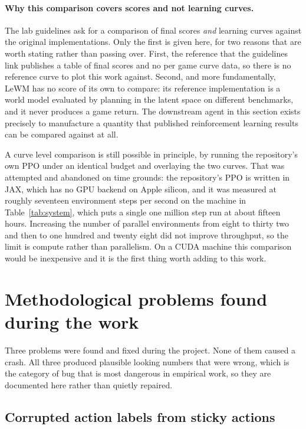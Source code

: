 \documentclass[11pt,a4paper]{article}
\begin{document}
\paragraph{Why this comparison covers scores and not learning curves.} The lab
guidelines ask for a comparison of final scores \emph{and} learning curves against
the original implementations. Only the first is given here, for two reasons that
are worth stating rather than passing over. First, the reference that the
guidelines link publishes a table of final scores and no per game curve data, so
there is no reference curve to plot this work against. Second, and more
fundamentally, LeWM has no score of its own to compare: its reference
implementation is a world model evaluated by planning in the latent space on
different benchmarks, and it never produces a game return. The downstream agent in
this section exists precisely to manufacture a quantity that published
reinforcement learning results can be compared against at all.

A curve level comparison is still possible in principle, by running the
repository's own PPO under an identical budget and overlaying the two curves. That
was attempted and abandoned on time grounds: the repository's PPO is written in
JAX, which has no GPU backend on Apple silicon, and it was measured at roughly
seventeen environment steps per second on the machine in Table~\ref{tab:system},
which puts a single one million step run at about fifteen hours. Increasing the
number of parallel environments from eight to thirty two and then to one hundred
and twenty eight did not improve throughput, so the limit is compute rather than
parallelism. On a CUDA machine this comparison would be inexpensive and it is the
first thing worth adding to this work.

\section{Methodological problems found during the work}
\label{sec:confounds}

Three problems were found and fixed during the project. None of them caused a
crash. All three produced plausible looking numbers that were wrong, which is the
category of bug that is most dangerous in empirical work, so they are documented
here rather than quietly repaired.

\subsection{Corrupted action labels from sticky actions}
\end{document}
